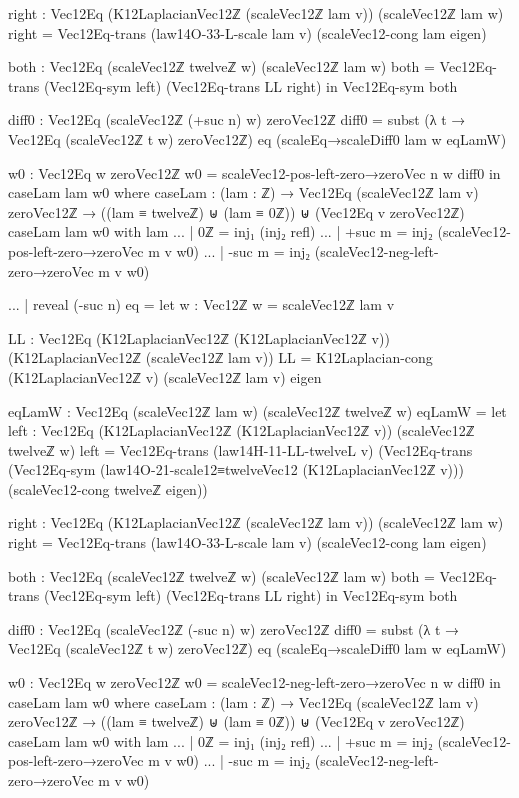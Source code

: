 \documentclass[11pt,a4paper]{book}
\begin{document}
\begin{code}
        right : Vec12Eq (K12LaplacianVec12ℤ (scaleVec12ℤ lam v)) (scaleVec12ℤ lam w)
        right = Vec12Eq-trans (law14O-33-L-scale lam v) (scaleVec12-cong lam eigen)

        both : Vec12Eq (scaleVec12ℤ twelveℤ w) (scaleVec12ℤ lam w)
        both = Vec12Eq-trans (Vec12Eq-sym left) (Vec12Eq-trans LL right)
      in
      Vec12Eq-sym both

    diff0 : Vec12Eq (scaleVec12ℤ (+suc n) w) zeroVec12ℤ
    diff0 = subst (λ t → Vec12Eq (scaleVec12ℤ t w) zeroVec12ℤ) eq (scaleEq→scaleDiff0 lam w eqLamW)

    w0 : Vec12Eq w zeroVec12ℤ
    w0 = scaleVec12-pos-left-zero→zeroVec n w diff0
  in
  caseLam lam w0
  where
    caseLam : (lam : ℤ) → Vec12Eq (scaleVec12ℤ lam v) zeroVec12ℤ → ((lam ≡ twelveℤ) ⊎ (lam ≡ 0ℤ)) ⊎ (Vec12Eq v zeroVec12ℤ)
    caseLam lam w0 with lam
    ... | 0ℤ = inj₁ (inj₂ refl)
    ... | +suc m = inj₂ (scaleVec12-pos-left-zero→zeroVec m v w0)
    ... | -suc m = inj₂ (scaleVec12-neg-left-zero→zeroVec m v w0)

... | reveal (-suc n) eq =
  let
    w : Vec12ℤ
    w = scaleVec12ℤ lam v

    LL : Vec12Eq (K12LaplacianVec12ℤ (K12LaplacianVec12ℤ v)) (K12LaplacianVec12ℤ (scaleVec12ℤ lam v))
    LL = K12Laplacian-cong (K12LaplacianVec12ℤ v) (scaleVec12ℤ lam v) eigen

    eqLamW : Vec12Eq (scaleVec12ℤ lam w) (scaleVec12ℤ twelveℤ w)
    eqLamW =
      let
        left : Vec12Eq (K12LaplacianVec12ℤ (K12LaplacianVec12ℤ v)) (scaleVec12ℤ twelveℤ w)
        left =
          Vec12Eq-trans
            (law14H-11-LL-twelveL v)
            (Vec12Eq-trans
              (Vec12Eq-sym (law14O-21-scale12≡twelveVec12 (K12LaplacianVec12ℤ v)))
              (scaleVec12-cong twelveℤ eigen))

        right : Vec12Eq (K12LaplacianVec12ℤ (scaleVec12ℤ lam v)) (scaleVec12ℤ lam w)
        right = Vec12Eq-trans (law14O-33-L-scale lam v) (scaleVec12-cong lam eigen)

        both : Vec12Eq (scaleVec12ℤ twelveℤ w) (scaleVec12ℤ lam w)
        both = Vec12Eq-trans (Vec12Eq-sym left) (Vec12Eq-trans LL right)
      in
      Vec12Eq-sym both

    diff0 : Vec12Eq (scaleVec12ℤ (-suc n) w) zeroVec12ℤ
    diff0 = subst (λ t → Vec12Eq (scaleVec12ℤ t w) zeroVec12ℤ) eq (scaleEq→scaleDiff0 lam w eqLamW)

    w0 : Vec12Eq w zeroVec12ℤ
    w0 = scaleVec12-neg-left-zero→zeroVec n w diff0
  in
  caseLam lam w0
  where
    caseLam : (lam : ℤ) → Vec12Eq (scaleVec12ℤ lam v) zeroVec12ℤ → ((lam ≡ twelveℤ) ⊎ (lam ≡ 0ℤ)) ⊎ (Vec12Eq v zeroVec12ℤ)
    caseLam lam w0 with lam
    ... | 0ℤ = inj₁ (inj₂ refl)
    ... | +suc m = inj₂ (scaleVec12-pos-left-zero→zeroVec m v w0)
    ... | -suc m = inj₂ (scaleVec12-neg-left-zero→zeroVec m v w0)
\end{code}
\end{document}
